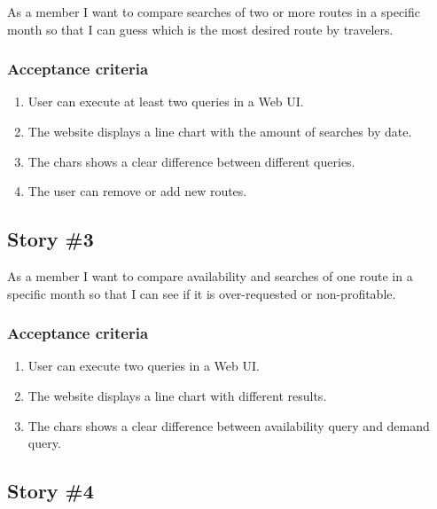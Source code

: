 \begin{displayquote}
As a  member I want to compare searches of two or more routes in a specific month so that I can guess which is the most desired route by travelers.
\end{displayquote}

\subsubsection*{Acceptance criteria}

\begin{enumerate}
    \item User can execute at least two queries in a Web UI.
    \item The website displays a line chart with the amount of searches by date.
    \item The chars shows a clear difference between different queries.
    \item The user can remove or add new routes.
\end{enumerate}

\subsection*{Story \#3}

\begin{displayquote}
As a  member I want to compare availability and searches of one route in a specific month so that I can see if it is over-requested or non-profitable.
\end{displayquote}

\subsubsection*{Acceptance criteria}

\begin{enumerate}
    \item User can execute two queries in a Web UI.
    \item The website displays a line chart with different results.
    \item The chars shows a clear difference between availability query and demand query.
\end{enumerate}

\subsection*{Story \#4}

